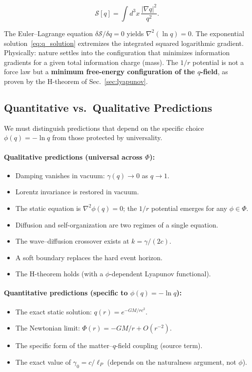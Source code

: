 \documentclass[aps,prd,twocolumn,showpacs,superscriptaddress,preprintnumbers]{revtex4-2}
\begin{document}
\begin{equation}
\mathcal{S}[q] = \int d^3x \, \frac{|\nabla q|^2}{q^2}.
\label{eq:action}
\end{equation}

The Euler--Lagrange equation $\delta\mathcal{S}/\delta q=0$ yields $\nabla^2(\ln q)=0$.
The exponential solution~\eqref{eq:q_solution} extremizes the integrated squared logarithmic gradient.
Physically: nature settles into the configuration that minimizes information gradients for a given total information charge (mass).
The $1/r$ potential is not a force law but a \textbf{minimum free-energy configuration of the $q$-field}, as proven by the H-theorem of Sec.~\ref{sec:lyapunov}.

\subsection{Quantitative vs.\ Qualitative Predictions}
\label{sec:qual_vs_quant}

We must distinguish predictions that depend on the specific choice $\phi(q)=-\ln q$ from those protected by universality.

\paragraph{Qualitative predictions (universal across $\Phi$):}
\begin{itemize}
    \item Damping vanishes in vacuum: $\gamma(q)\to0$ as $q\to1$.
    \item Lorentz invariance is restored in vacuum.
    \item The static equation is $\nabla^2\phi(q)=0$; the $1/r$ potential emerges for any $\phi\in\Phi$.
    \item Diffusion and self-organization are two regimes of a single equation.
    \item The wave--diffusion crossover exists at $k=\gamma/(2c)$.
    \item A soft boundary replaces the hard event horizon.
    \item The H-theorem holds (with a $\phi$-dependent Lyapunov functional).
\end{itemize}

\paragraph{Quantitative predictions (specific to $\phi(q)=-\ln q$):}
\begin{itemize}
    \item The exact static solution: $q(r)=e^{-GM/rc^2}$.
    \item The Newtonian limit: $\Phi(r)=-GM/r + O(r^{-2})$.
    \item The specific form of the matter--$q$-field coupling (source term).
    \item The exact value of $\gamma_0=c/\ell_P$ (depends on the naturalness argument, not $\phi$).
\end{itemize}
\end{document}
